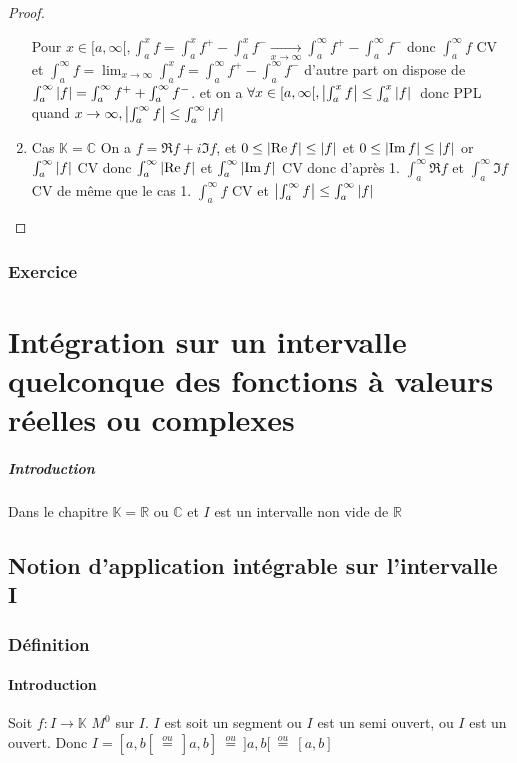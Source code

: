 \documentclass[11pt,hidelinks]{book}
\theoremstyle{mytheoremstyle}
\theoremstyle{mytheoremstyle}
\theoremstyle{mytheoremstyle}
\theoremstyle{mytheoremstyle}
\theoremstyle{mytheoremstyle}
\theoremstyle{mytheoremstyle}
\theoremstyle{mytheoremstyle}
\theoremstyle{mytheoremstyle}
\theoremstyle{myproblemstyle}
\def\mbb#1{\mathbb{#1}}
\def\bC{\mbb{C}}
\def\bR{\mbb{R}}
\def\ig#1{\int_{a}^{\infty} #1}
\def\bK{\mbb{K}}
\def\af{[a,\infty[}
\def\ab{[a,b[}
\def\abc{]a,b]}
\def\abd{]a,b[}
\newcommand{\func}[3]{#1\colon#2\to#3}
\begin{document}
\begin{adjustwidth}{-2em}{-1em}
\begin{theorem}
\begin{proof}
\begin{enumerate}
                Pour $x \in \af, \int_{a}^{x} f  = \int_{a}^{x} f^+ - \int_{a}^{x} f^- \xrightarrow[x \to \infty]{} \ig{f^+} - \ig{f^-}$
                donc $\ig{f}$ CV et $\ig{f} = \lim_{x \to \infty} \int_{a}^{x} f = \ig{f^+} - \ig{f^-}$
                d'autre part on dispose de 
                $\ig{\abs{f}} = \ig{f^+} + \ig{f^-}$. 
                et on a $\forall x \in \af, \abs{\int_{a}^{x} f} \leq \int_{a}^{x} \abs*{f}$
                donc PPL quand $x \to \infty, \abs{\ig{f}} \leq \ig{\abs{f}}$ 
                
                \item Cas $\bK = \bC$ 
                On a $f = \Re f + i\Im f$, et $0 \leq \abs{\Re f} \leq \abs{f}$ et $0 \leq \abs{\Im f} \leq \abs{f}$
                or $\ig{\abs{f}}$ CV donc $\ig{\abs{\Re f}}$ et $\ig{\abs{\Im f}}$ CV 
                donc d'après 1. $\ig{\Re f}$ et $\ig{\Im f}$ CV
                de même que le cas 1. $\ig{f}$ CV et $\abs{\ig{f}} \leq \ig{\abs{f}}$
                \end{enumerate}
            \end{proof}
        \end{theorem}
        \subsection{Exercice}
        \begin{exe}{8.1}
        \end{exe}
    \end{adjustwidth}

    \chapter{Intégration sur un intervalle quelconque des fonctions à valeurs réelles ou complexes}
    \paragraph{Introduction} 
    Dans le chapitre $\bK = \bR$ ou $\bC$ et $I$ est un intervalle non vide de $\bR$
    \section{Notion d'application intégrable sur l'intervalle I}
    \subsection{Définition}
    \subsubsection{Introduction}
    Soit $\func{f}{I}{\bK}$ $M^0$ sur $I$. $I$ est soit un segment 
    ou $I$ est un semi ouvert, ou $I$ est un ouvert. Donc $I = \ab \ \overset{ou}{=} \  \abc\ \overset{ou}{=} \  \abd \  \overset{ou}{=} \ [a,b]$
    \newline 
\end{document}
